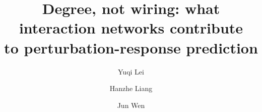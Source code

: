 \documentclass[runningheads]{llncs}
\newcommand{\note}[1]{\textcolor{blue}{[#1]}}                   %
\begin{document}
\title{Degree, not wiring: what interaction networks contribute\\ to perturbation-response prediction}

\author{Yuqi Lei \and Hanzhe Liang \and Jun Wen}
\institute{\note{affiliations to be confirmed}}

\maketitle










\clearpage
\appendix

\end{document}
